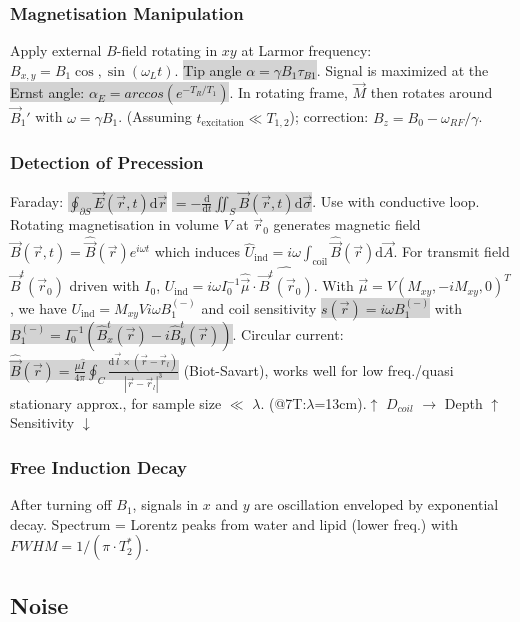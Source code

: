 \documentclass[9pt]{article}
\newcommand{\grey}[1]{\setlength{\fboxsep}{0pt}\colorbox{lightgrey}{#1}}
\newcommand{\dif}{\mathrm{d}}
\newcommand{\del}{\partial}
\begin{document}
\begin{multicols}{2}
\subsubsection{Magnetisation Manipulation}
Apply external $B$-field rotating in $xy$ at Larmor frequency: $B_{x,y} = B_1 \cos,\sin(\omega_Lt)$. \grey{Tip angle $ \alpha =\gamma B_1 \tau _{B1}$}. Signal is maximized at the \grey{Ernst angle: $\alpha _E = arccos(e^{-T_R/T_1})$}. In rotating frame, $\vec M$ then rotates around $\vec B_1'$ with $\omega = \gamma B_1$. (Assuming $t_\mathrm{excitation} \ll T_{1,2}$); correction: $B_z=B_0-\omega_{RF}/\gamma$. 

\subsubsection{Detection of Precession}
Faraday: 
\grey{$\oint_{\del S} \vec E(\vec r, t) \dif \vec r$} \grey{$= - \frac{\dif}{\dif t} \iint_S \vec B(\vec r, t) \dif \vec \sigma$}.
Use with conductive loop. Rotating magnetisation in volume $V$ at $\vec r_0$ generates magnetic field $\vec B(\vec r, t) = \hat{\vec B}(\vec r) e^{i\omega t}$ which induces $\hat U_\mathrm{ind} = i\omega \int_\mathrm{coil} \hat{\vec B} (\vec r) \dif \vec A$. For transmit field $\vec B^t (\vec r_0)$ driven with $I_0$, $U_\mathrm{ind} = i\omega I_0^{-1} \hat{\vec{\mu}} \cdot \hat{\vec B^t(\vec r_0)}$.
With $\vec \mu = V (M_{xy}, -iM_{xy}, 0)^T$, 
we have $U_\mathrm{ind} = M_{xy} V i \omega B_1^{(-)}$ 
and coil sensitivity \grey{$s(\vec r) = i \omega B_1^{(-)}$} with \grey{$B_1^{(-)} = I_0^{-1}(\hat B_x^t(\vec r) - i \hat B_y^t(\vec r))$}. Circular current: \grey{$\hat{\vec B} (\vec r) = \frac{\mu \hat I}{4\pi} \oint_C \frac{\dif \vec l \times (\vec r - \vec r_l)}{|\vec r - \vec r_l|^3}$} (Biot-Savart), works well for low freq./quasi stationary approx., for sample size $\ll$ $\lambda$. (@7T:$\lambda$=13cm).$\uparrow$ $D_{coil}$  $\rightarrow$ Depth $\uparrow$ Sensitivity $\downarrow$

\subsubsection{Free Induction Decay}
After turning off $B_1$, signals in $x$ and $y$ are oscillation enveloped by exponential decay. Spectrum = Lorentz peaks from water and lipid (lower freq.) with $FWHM = 1/(\pi \cdot T_2^*)$.
\vspace{-2mm}
\subsection{Noise} 


\end{multicols}
\end{document}
